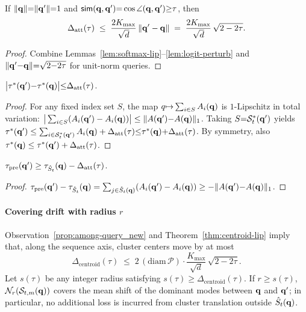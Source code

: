 \begin{lemma}
\label{lem:sim-to-var}
If $\|\mathbf{q}\|{=}\|\mathbf{q}'\|{=}1$ and $\mathsf{sim}(\mathbf{q},\mathbf{q}'){=}\cos\angle(\mathbf{q},\mathbf{q}'){\ge} \tau$, then
\[
\Delta_{\mathrm{att}}(\tau)
\;\le\;
\frac{2K_{\max}}{\sqrt d}\,\|\mathbf{q}'-\mathbf{q}\|
\;=\;
\frac{2K_{\max}}{\sqrt d}\,\sqrt{2-2\tau}.
\]
\end{lemma}
\begin{proof}
Combine Lemmas~\ref{lem:softmax-lip}--\ref{lem:logit-perturb} and $\|\mathbf{q}'{-}\mathbf{q}\|{=}\sqrt{2{-}2\tau}$ for unit-norm queries.
\end{proof}

\begin{lemma}
\label{lem:oracle-mass}
$\big|\tau^\ast(\mathbf{q}'){-}\tau^\ast(\mathbf{q})\big|{\le} \Delta_{\mathrm{att}}(\tau)$.
\end{lemma}

\begin{proof}
For any fixed index set $S$, the map $q{\mapsto} \sum_{i\in S}A_i(\mathbf{q})$ is $1$-Lipschitz in total variation:
$\big|\sum_{i\in S}(A_i(\mathbf{q}')-A_i(\mathbf{q}))\big|\le \|A(\mathbf{q}'){-}A(\mathbf{q})\|_1$.
Taking $S{=}\mathcal{S}^\ast_t(\mathbf{q}')$ yields
$\tau^\ast(\mathbf{q}') \le \sum_{i\in \mathcal{S}^\ast_t(\mathbf{q}')} A_i(\mathbf{q}) + \Delta_{\mathrm{att}}(\tau){\le} \tau^\ast(\mathbf{q}){+}\Delta_{\mathrm{att}}(\tau)$.
By symmetry, also $\tau^\ast(\mathbf{q})\le \tau^\ast(\mathbf{q}')+\Delta_{\mathrm{att}}(\tau)$.
\end{proof}

\begin{lemma}
\label{lem:reuse-lb}
$\tau_{\mathrm{pre}}(\mathbf{q}') \ge \tau_{\hat S_t}(\mathbf{q})-\Delta_{\mathrm{att}}(\tau)$.
\end{lemma}
\begin{proof}
$\tau_{\mathrm{pre}}(\mathbf{q}')- \tau_{\hat S_t}(\mathbf{q})=\sum_{j\in \hat S_t(\mathbf{q})}(A_i(\mathbf{q}')-A_i(\mathbf{q}))\ge -\|A(\mathbf{q}'){-}A(\mathbf{q})\|_1$.
\end{proof}

\paragraph{Covering drift with radius $r$}
Observation~\ref{prop:among-query_new} and Theorem~\ref{thm:centroid-lip} imply that, along the sequence axis,
cluster centers move by at most
\[
\Delta_{\mathrm{centroid}}(\tau)
\;\le\; 2\,(\mathrm{diam}\,\mathcal{P})\cdot \frac{K_{\max}}{\sqrt d}\,\sqrt{2-2\tau}.
\]
Let $s(\tau)$ be any integer radius satisfying $s(\tau)\ge \Delta_{\mathrm{centroid}}(\tau)$.
If $r\ge s(\tau)$, $\mathcal{N}_r(\mathcal{S}_{t,m}(\mathbf{q}))$ covers the mean shift of the dominant
modes between $\mathbf{q}$ and $\mathbf{q}'$; in particular, no additional loss is incurred from cluster translation outside $\hat S_t(\mathbf{q})$.


